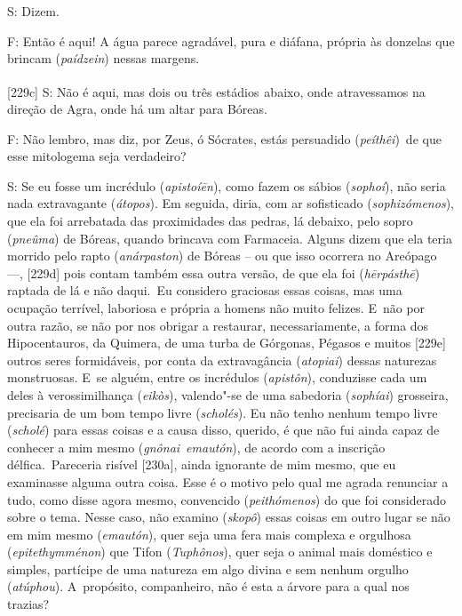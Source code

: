  

S: Dizem.

 

F: Então é aqui! A água parece agradável, pura e diáfana, própria às
donzelas que brincam (\emph{paídzein}) nessas margens.

 

[229c] S: Não é aqui, mas dois ou três
estádios\textsuperscript{~}abaixo, onde atravessamos na direção de Agra,
onde há um altar para Bóreas.

 

F: Não lembro, mas diz, por Zeus, ó Sócrates, estás persuadido
(\emph{peíthêi})~de que esse mitologema seja verdadeiro?

 

S: Se eu fosse um incrédulo (\emph{apistoíēn}), como fazem os sábios
(\emph{sophoí}), não seria nada extravagante (\emph{átopos}). Em
seguida, diria, com ar sofisticado (\emph{sophizómenos}), que ela foi
arrebatada das proximidades das pedras, lá debaixo, pelo sopro
(\emph{pneûma}) de Bóreas, quando brincava com Farmaceia. Alguns dizem
que ela teria morrido pelo rapto (\emph{anárpaston}) de Bóreas -- ou que
isso ocorrera no Areópago \mbox{---,} [229d] pois contam também essa outra
versão, de que ela foi (\emph{hērpásthē}) raptada de lá e não daqui.~Eu
considero graciosas essas coisas, mas uma ocupação terrível, laboriosa e
própria a homens não muito felizes. E~não por outra razão, se não por nos
obrigar a restaurar, necessariamente, a forma dos Hipocentauros, da
Quimera, de uma turba de Górgonas, Pégasos e muitos [229e] outros
seres formidáveis, por conta da extravagância (\emph{atopiai}) dessas
naturezas monstruosas. E~se alguém, entre os incrédulos
(\emph{apistôn}), conduzisse cada um deles à verossimilhança
(\emph{eikòs}), valendo"-se de uma sabedoria (\emph{sophíai}) grosseira,
precisaria de um bom tempo livre (\emph{scholés}). Eu não tenho nenhum
tempo livre (\emph{scholé}) para essas coisas e a causa disso, querido,
é que não fui ainda capaz de conhecer a mim mesmo
(\emph{gnônai}~\emph{emautón}), de acordo com a inscrição
délfica.~Pareceria risível [230a], ainda ignorante de mim mesmo, que
eu examinasse alguma outra coisa. Esse é o motivo pelo qual me agrada
renunciar a tudo, como disse agora mesmo, convencido
(\emph{peithómenos}) do que foi considerado sobre o tema. Nesse caso,
não examino (\emph{skopô}) essas coisas em outro lugar se não em mim
mesmo (\emph{emautón}), quer seja uma fera mais complexa e orgulhosa
(\emph{epitethymménon}) que Tifon (\emph{Tuphônos}), quer seja o animal
mais doméstico e simples, partícipe de uma natureza em algo divina e sem
nenhum orgulho (\emph{atúphou}). A~propósito, companheiro, não é esta a
árvore para a qual nos trazias?

